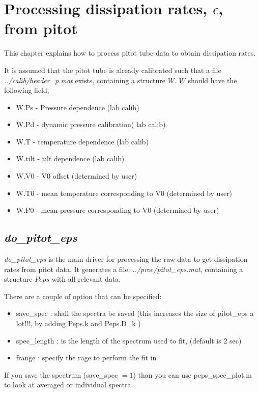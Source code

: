 \chapter{Processing dissipation rates, $\epsilon$, from pitot}
This chapter explains how to process pitot tube data to obtain 
dissipation rates. 

It is assumed that the pitot tube is already calibrated such 
that a file \textit{{../calib/header\_p.mat}} exists, containing 
a structure $W$. $W$ should have the following field, 
\begin{itemize}
   \item W.Ps     -  Pressure dependence  (lab calib)
   \item W.Pd     -  dynamic pressure calibration( lab calib)
   \item W.T      -  temperature dependence (lab calib) 
   \item W.tilt   -  tilt dependence (lab calib)
   \item W.V0     -  V0 offset (determined by user)
   \item W.T0     -  mean temperature corresponding to V0 (determined by user)
   \item W.P0     -  mean pressure corresponding to V0 (determined by user)
\end{itemize}

\section{\textit{{do\_pitot\_eps}}}
\textit{{do\_pitot\_eps}} is the main driver for processing the raw data to get
dissipation rates from pitot data. It generates a file: \textit{../proc/pitot\_eps.mat},
containing a structure $Peps$ with all relevant data.

There are a couple of option that can be specified:
\begin{itemize}
   \item {save\_spec}  :  shall the spectra be saved (this increases the size of pitot\_eps a lot!!!, by adding Peps.k and Peps.D\_k )
   \item spec\_length  : is the length of the spectrum used to fit, (default is 2 sec)
   \item frange        : specify the rage to perform the fit in
\end{itemize}

If you save the spectrum (save\_spec $= 1$) than you can use peps\_spec\_plot.m 
to look at averaged or individual spectra.

